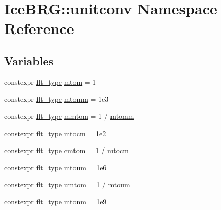 \hypertarget{namespaceIceBRG_1_1unitconv}{}\section{Ice\+B\+R\+G\+:\+:unitconv Namespace Reference}
\label{namespaceIceBRG_1_1unitconv}
\subsection*{Variables}
\begin{DoxyCompactItemize}
\item 
constexpr \hyperlink{lib_2IceBRG__main_2common_8h_ad0f130a56eeb944d9ef2692ee881ecc4}{flt\+\_\+type} \hyperlink{namespaceIceBRG_1_1unitconv_a74daefd07edcb727cfb81bcbee32fda6}{mtom} = 1
\item 
constexpr \hyperlink{lib_2IceBRG__main_2common_8h_ad0f130a56eeb944d9ef2692ee881ecc4}{flt\+\_\+type} \hyperlink{namespaceIceBRG_1_1unitconv_a97ff30f991dfcc4d3efb37b56f8d413d}{mtomm} = 1e3
\item 
constexpr \hyperlink{lib_2IceBRG__main_2common_8h_ad0f130a56eeb944d9ef2692ee881ecc4}{flt\+\_\+type} \hyperlink{namespaceIceBRG_1_1unitconv_a48ae0a96fd539ae3e6d4af99faeb67aa}{mmtom} = 1 / \hyperlink{namespaceIceBRG_1_1unitconv_a97ff30f991dfcc4d3efb37b56f8d413d}{mtomm}
\item 
constexpr \hyperlink{lib_2IceBRG__main_2common_8h_ad0f130a56eeb944d9ef2692ee881ecc4}{flt\+\_\+type} \hyperlink{namespaceIceBRG_1_1unitconv_a7df943f40f1d4d1d3cb6aeae549a34f9}{mtocm} = 1e2
\item 
constexpr \hyperlink{lib_2IceBRG__main_2common_8h_ad0f130a56eeb944d9ef2692ee881ecc4}{flt\+\_\+type} \hyperlink{namespaceIceBRG_1_1unitconv_aed8caa21654848af6e1f08e0fe03da7b}{cmtom} = 1 / \hyperlink{namespaceIceBRG_1_1unitconv_a7df943f40f1d4d1d3cb6aeae549a34f9}{mtocm}
\item 
constexpr \hyperlink{lib_2IceBRG__main_2common_8h_ad0f130a56eeb944d9ef2692ee881ecc4}{flt\+\_\+type} \hyperlink{namespaceIceBRG_1_1unitconv_a2f37d6dcda7953f12afa278778b7e256}{mtoum} = 1e6
\item 
constexpr \hyperlink{lib_2IceBRG__main_2common_8h_ad0f130a56eeb944d9ef2692ee881ecc4}{flt\+\_\+type} \hyperlink{namespaceIceBRG_1_1unitconv_aa1386b920e7e1910102f787af80e7da7}{umtom} = 1 / \hyperlink{namespaceIceBRG_1_1unitconv_a2f37d6dcda7953f12afa278778b7e256}{mtoum}
\item 
constexpr \hyperlink{lib_2IceBRG__main_2common_8h_ad0f130a56eeb944d9ef2692ee881ecc4}{flt\+\_\+type} \hyperlink{namespaceIceBRG_1_1unitconv_a7f73f7a919a494076732759964c87efc}{mtonm} = 1e9

\end{DoxyCompactItemize}
